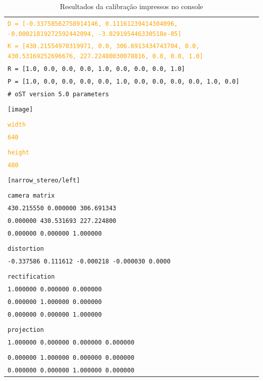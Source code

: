 \begin{table}[H]\label{tb:5}
\begin{tabular}{| p{\textwidth}|}
\hline
\textcolor{orange}{\texttt{D = [-0.33758562758914146, 0.11161239414304096, -0.00021819272592442094, -3.029195446330518e-05]}}\\
\textcolor{orange}{\texttt{K = [430.21554970319971, 0.0, 306.6913434743704, 0.0, 430.53169252696676, 227.22480030078816, 0.0, 0.0, 1.0]}}\\
\texttt{R = [1.0, 0.0, 0.0, 0.0, 1.0, 0.0, 0.0, 0.0, 1.0]}\\
\texttt{P = [1.0, 0.0, 0.0, 0.0, 0.0, 1.0, 0.0, 0.0, 0.0, 0.0, 1.0, 0.0]}\\
 \texttt{\# oST version 5.0 parameters}\\
\\
 \texttt{[image]}\\
\\
\textcolor{orange}{\texttt{width}}\\
\textcolor{orange}{\texttt{640}}\\
\\
\textcolor{orange}{\texttt{height}}\\
\textcolor{orange}{\texttt{480}}\\
\\
 \texttt{[narrow\_stereo/left]}\\
\\
\texttt{camera matrix}\\
\texttt{430.215550 0.000000 306.691343}\\
\texttt{0.000000 430.531693 227.224800}\\
\texttt{0.000000 0.000000 1.000000}\\
\\
 \texttt{distortion}\\
 \texttt{-0.337586 0.111612 -0.000218 -0.000030 0.0000}\\
\\
 \texttt{rectification}\\
 \texttt{1.000000 0.000000 0.000000}\\
 \texttt{0.000000 1.000000 0.000000}\\
 \texttt{0.000000 0.000000 1.000000}\\
\\
 \texttt{projection}\\
 \texttt{1.000000 0.000000 0.000000 0.000000}\\
\\
 \texttt{0.000000 1.000000 0.000000 0.000000}\\
 \texttt{0.000000 0.000000 1.000000 0.000000}\\
\hline
\end{tabular}
\caption{Resultados da calibração impressos no console}
\end{table}

